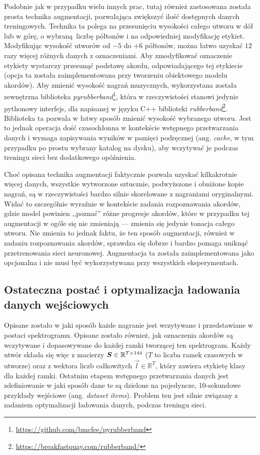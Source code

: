 Podobnie jak w przypadku wielu innych prac, tutaj również zastosowana została prosta technika augmentacji, pozwalająca zwiększyć ilość dostępnych danych treningowych. Technika ta polega na przesunięciu wysokości całego utworu w dół lub w górę, o wybraną liczbę półtonów i na odpowiedniej modyfikację etykiet. Modyfikując wysokość utworów od $-5$ do $+6$ półtonów, można łatwo uzyskać $12$ razy więcej różnych danych z oznaczeniami. Aby zmodyfikować oznaczenie etykiety wystarczy przesunąć podstawę akordu, odpowiadającego tej etykiecie (opcja ta została zaimplementowana przy tworzeniu obiektowego modelu akordów). Aby zmienić wysokość nagrań muzycznych, wykorzystana została zewnętrzna biblioteka \emph{pyrubberband}\footnote{\url{https://github.com/bmcfee/pyrubberband}}, która w rzeczywistości stanowi jedynie pythonowy interfejs, dla napisanej w języku C++ biblioteki \emph{rubberband}\footnote{\url{https://breakfastquay.com/rubberband/}}. Biblioteka ta pozwala w łatwy sposób zmienić wysokość wybranego utworu. Jest to jednak operacja dość czasochłonna w kontekście wstępnego przetwarzania danych i wymaga zapisywania wyników w pamięci podręcznej (ang. \emph{cache}, w tym przypadku po prostu wybrany katalog na dysku), aby wczytywać je podczas treningu sieci bez dodatkowego opóźnienia.

Choć opisana technika augmentacji faktycznie pozwala uzyskać kilkakrotnie więcej danych, wszystkie wytworzone sztucznie, podwyższone i obniżone kopie nagrań, są w rzeczywistości bardzo silnie skorelowane z nagraniami oryginalnymi. Widać to szczególnie wyraźnie w kontekście zadania rozpoznawania akordów, gdzie model powinien ,,poznać'' różne progresje akordów, które w przypadku tej augmentacji w ogóle się nie zmieniają --- zmienia się jedynie tonacja całego utworu. Nie zmienia to jednak faktu, że ten sposób augmentacji, również w zadaniu rozpoznawania akordów, sprawdza się dobrze i bardzo pomaga uniknąć przetrenowania sieci neuronowej. Augmentacja ta została zaimplementowana jako opcjonalna i nie musi być wykorzystywana przy wszystkich eksperymentach.

\subsection{Ostateczna postać i optymalizacja ładowania danych wejściowych}

Opisane zostało w jaki sposób każde nagranie jest wczytywane i przedstawiane w postaci spektrogramu.  Opisane zostało również, jak oznaczenia akordów są wczytywane i dopasowywane do każdej ramki tworzącej ten spektrogram. Każdy utwór składa się więc z macierzy $\boldsymbol{S} \in \mathbb{R}^{T \times 144}$ ($T$ to liczba ramek czasowych w utworze) oraz z wektora liczb całkowitych $\vec l \in \mathbb{R}^T$, który zawiera etykietę klasy dla każdej ramki. Ostatnim etapem wstępnego przetwarzania danych jest zdefiniowanie w jaki sposób dane te są dzielone na pojedyncze, 10-sekundowe przykłady wejściowe (ang. \emph{dataset items}). Problem ten jest silnie związany z zadaniem optymalizacji ładowania danych, podczas treningu sieci.


